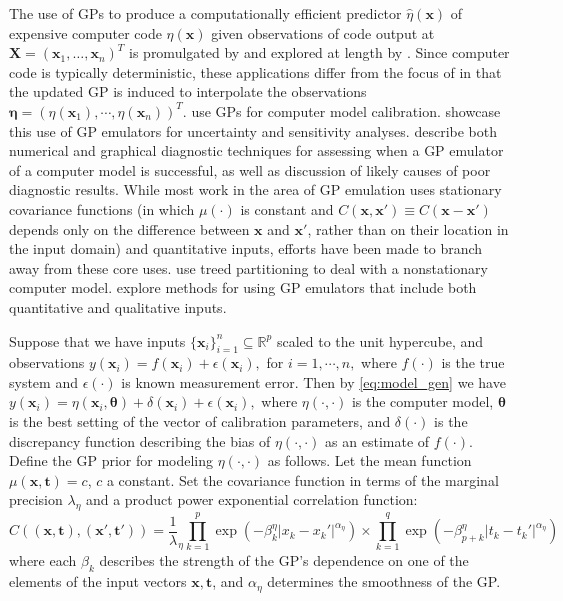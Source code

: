 \documentclass[12pt]{article}
\begin{document}
The use of GPs to produce a computationally efficient predictor $\hat \eta (\mathbf x)$ of expensive computer code $\eta(\mathbf x)$ given observations of code output at $\mathbf X=(\mathbf x_1,\ldots,\mathbf x_n)^T$ is promulgated by \cite{Sacks1989} and explored at length by \cite{Santner2003a}.
%
Since computer code is typically deterministic, these applications differ from the focus of \cite{OHagan1978} in that the updated GP is induced to interpolate the observations $\boldsymbol \eta = (\eta(\mathbf x_1),\cdots,\eta(\mathbf x_n))^T$. 
%
\cite{Kennedy2001} use GPs for computer model calibration. 
%
\cite{Kennedy2006} showcase this use of GP emulators for uncertainty and sensitivity analyses. 
%
\cite{Bastos2009} describe both numerical and graphical diagnostic techniques for assessing when a GP emulator of a computer model is successful, as well as discussion of likely causes of poor diagnostic results. 
%
While most work in the area of GP emulation uses stationary covariance functions (in which $\mu(\cdot)$ is constant and $C(\mathbf x,\mathbf x' )\equiv C(\mathbf x-\mathbf x' )$ depends only on the difference between $\mathbf x$ and $\mathbf x'$, rather than on their location in the input domain) and quantitative inputs, efforts have been made to branch away from these core uses. 
%
\cite{Gramacy2008} use treed partitioning to deal with a nonstationary computer model. 
%
\cite{Qian2008} explore methods for using GP emulators that include both quantitative and qualitative inputs.
%

Suppose that we have inputs $\{\mathbf x_i\}_{i=1}^n\subseteq \mathbb R^p$ scaled to the unit hypercube, and observations 
%
$y(\mathbf x_i) = f(\mathbf x_i) + \epsilon(\mathbf x_i),$ for $i=1,\cdots,n,$
%
where $f(\cdot)$ is the true system and $\epsilon(\cdot)$ is known measurement error. 
%
Then by \eqref{eq:model_gen} we have
%
$y(\mathbf x_i) = \eta(\mathbf x_i,\boldsymbol \theta) + \delta(\mathbf x_i) + \epsilon(\mathbf x_i),$
%
where $\eta(\cdot,\cdot)$ is the computer model, $\boldsymbol \theta$ is the best setting of the vector of calibration parameters, and $\delta(\cdot)$ is the discrepancy function describing the bias of $\eta(\cdot,\cdot)$ as an estimate of $f(\cdot)$.
Define the GP prior for modeling $\eta(\cdot,\cdot)$ as follows. 
%
Let the mean function $\mu(\mathbf x,\mathbf t)=c$, $c$ a constant. 
%
Set the covariance function in terms of the marginal precision $\lambda_\eta$ and a product power exponential correlation function:
%
\begin{equation}\label{eq:Hig_cov}
C((\mathbf x,\mathbf t),(\mathbf x',\mathbf t')) = \frac 1\lambda_\eta \prod_{k=1}^{p}
\exp \left(-\beta^\eta_k|x_k-x_k'|^{\alpha_\eta}\right) \times
\prod_{k=1}^{q}
\exp \left(-\beta^\eta_{p+k}|t_k-t_k'|^{\alpha_\eta}\right)
\end{equation}
%
where each $\beta_k$ describes the strength of the GP's dependence on one of the elements of the input vectors $\mathbf x,\mathbf t$, and $\alpha_\eta$ determines the smoothness of the GP. 
\end{document}
